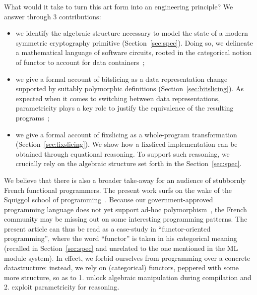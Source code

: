 \documentclass[draft,english]{jflart}
\begin{document}

What would it take to turn this art form into an engineering
principle? We answer through 3 contributions:
%
\begin{itemize}
\item we identify the algebraic structure necessary to model the state
  of a modern symmetric cryptography primitive
  (Section~\ref{sec:spec}). Doing so, we delineate a mathematical
  language of software circuits, rooted in the categorical notion of
  functor to account for data containers~;
\item we give a formal account of bitslicing as a data representation
  change supported by suitably polymorphic definitions
  (Section~\ref{sec:bitslicing}). As expected when it comes to
  switching between data representations, parametricity plays a key
  role to justify the equivalence of the resulting programs~;
\item we give a formal account of fixslicing as a whole-program
  transformation (Section~\ref{sec:fixslicing}). We show how a
  fixsliced implementation can be obtained through equational
  reasoning. To support such reasoning, we crucially rely on the
  algebraic structure set forth in the Section~\ref{sec:spec}.
\end{itemize}


We believe that there is also a broader take-away for an audience of
stubbornly French functional programmers. The present work surfs on
the wake of the Squiggol school of
programming~\citep{wg21,gibbons:naperian}. Because our
government-approved programming language does not yet support ad-hoc
polymorphism~\citep{remy:explicit-poly}, the French community may be
missing out on some interesting programming patterns. The present
article can thus be read as a case-study in ``functor-oriented
programming'', where the word ``functor'' is taken in his categorical
meaning (recalled in Section~\ref{sec:spec} and unrelated to the one
mentioned in the ML module system). In effect, we forbid ourselves
from programming over a concrete datastructure: instead, we rely on
(categorical) functors, peppered with some more structure, so as to 1.
unlock algebraic manipulation during compilation and 2. exploit
parametricity for reasoning.
\end{document}
